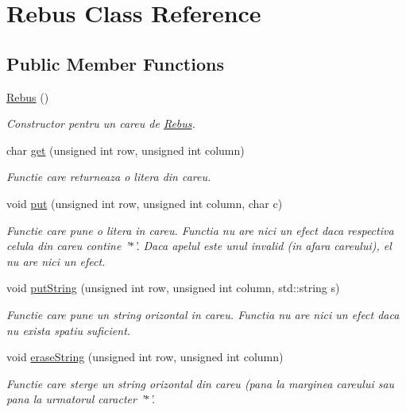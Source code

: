 \hypertarget{classRebus}{
\section{Rebus Class Reference}
\label{classRebus}
}
\subsection*{Public Member Functions}
\begin{DoxyCompactItemize}
\item 
\hyperlink{classRebus_ada84d588bdfa1bd624f4a3bb27ce2c76}{Rebus} ()
\begin{DoxyCompactList}\small\item\em Constructor pentru un careu de \hyperlink{classRebus}{Rebus}. \item\end{DoxyCompactList}\item 
char \hyperlink{classRebus_a1da48c3c6eccfcfe78285ba3e7395bcc}{get} (unsigned int row, unsigned int column)
\begin{DoxyCompactList}\small\item\em Functie care returneaza o litera din careu. \item\end{DoxyCompactList}\item 
void \hyperlink{classRebus_ad6dd40d142119027fa581111509a2853}{put} (unsigned int row, unsigned int column, char c)
\begin{DoxyCompactList}\small\item\em Functie care pune o litera in careu. Functia nu are nici un efect daca respectiva celula din careu contine '$\ast$'. Daca apelul este unul invalid (in afara careului), el nu are nici un efect. \item\end{DoxyCompactList}\item 
void \hyperlink{classRebus_a57b95672c0bf931f1605b18c5cbed815}{putString} (unsigned int row, unsigned int column, std::string s)
\begin{DoxyCompactList}\small\item\em Functie care pune un string orizontal in careu. Functia nu are nici un efect daca nu exista spatiu suficient. \item\end{DoxyCompactList}\item 
void \hyperlink{classRebus_a3b93d56e569bb72d7825ddebd6e902c9}{eraseString} (unsigned int row, unsigned int column)
\begin{DoxyCompactList}\small\item\em Functie care sterge un string orizontal din careu (pana la marginea careului sau pana la urmatorul caracter '$\ast$'. \item\end{DoxyCompactList}\item 

\end{DoxyCompactItemize}
